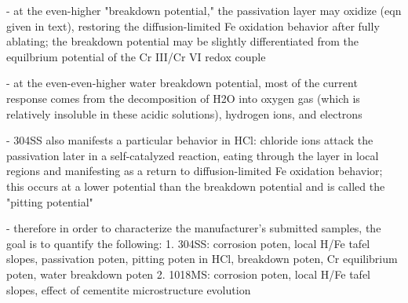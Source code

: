 - at the even-higher "breakdown potential," the passivation layer may oxidize (eqn given in text), restoring the diffusion-limited Fe oxidation behavior after fully ablating; the breakdown potential may be slightly differentiated from the equilbrium potential of the Cr III/Cr VI redox couple

- at the even-even-higher water breakdown potential, most of the current response comes from the decomposition of H2O into oxygen gas (which is relatively insoluble in these acidic solutions), hydrogen ions, and electrons

- 304SS also manifests a particular behavior in HCl: chloride ions attack the passivation later in a self-catalyzed reaction, eating through the layer in local regions and manifesting as a return to diffusion-limited Fe oxidation behavior; this occurs at a lower potential than the breakdown potential and is called the "pitting potential"

- therefore in order to characterize the manufacturer's submitted samples, the goal is to quantify the following:
	1. 304SS: corrosion poten, local H/Fe tafel slopes, passivation poten, pitting poten in HCl, breakdown poten, Cr equilibrium poten, water breakdown poten
	2. 1018MS: corrosion poten, local H/Fe tafel slopes, effect of cementite microstructure evolution
\fi
